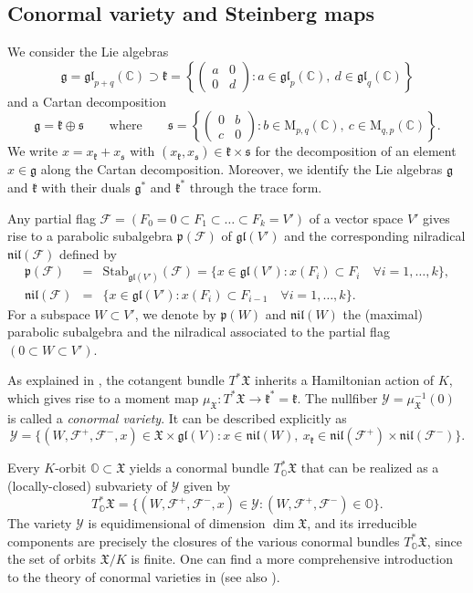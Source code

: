 \documentclass[ALCO,Unicode]{cedram}
\newcommand{\fk}{\mathfrak{k}}
\newcommand{\fs}{\mathfrak{s}}
\newcommand{\fg}{\mathfrak{g}}
\newcommand{\fp}{\mathfrak{p}}
\newcommand{\gl}{\mathfrak{gl}}
\newcommand{\nil}{\mathfrak{nil}}
\newcommand{\Mat}{\mathrm{M}}
\newcommand{\flag}{\mathcal{F}}
\newcommand{\conormal}{\mathcal{Y}}
\newcommand{\Xorbit}{\mathbb{O}}
\newcommand{\Xfv}{\mathfrak{X}}
\newcommand{\mC}{\mathbb{C}}
\begin{document}
\subsection{Conormal variety and Steinberg maps}
\label{section-1.2}
We consider the Lie algebras
\[
\fg=\gl_{p+q}(\mC)\supset\fk=\left\{\begin{pmatrix} a & 0\\ 0 & d \end{pmatrix}:a\in\gl_p(\mC),\ d\in\gl_q(\mC)\right\}
\]
and a Cartan decomposition
\[
\fg=\fk\oplus\fs\qquad\mbox{where}\qquad\fs=\left\{\begin{pmatrix} 0 & b\\ c & 0 \end{pmatrix}:b\in\Mat_{p,q}(\mC),\ c\in\Mat_{q,p}(\mC)\right\}.
\]
We write $x=x_\fk+x_\fs$ with $(x_\fk,x_\fs)\in\fk\times\fs$ for the decomposition of an element $x\in\fg$ along the Cartan decomposition.
Moreover, we identify the Lie algebras $\fg$ and $\fk$ with their duals $\fg^*$ and $\fk^*$ through the trace form.

Any partial flag $\flag=(F_0=0\subset F_1\subset\ldots\subset F_k=V')$ of a vector space $V'$ gives rise to a parabolic subalgebra $\fp(\flag)$ of $\gl(V')$ and the corresponding nilradical $\nil(\flag)$ defined by
\begin{eqnarray*}
\fp(\flag) & = & \mathrm{Stab}_{\gl(V')}(\flag)=\{x\in\gl(V'):x(F_i)\subset F_i\quad \forall i=1,\ldots,k\},\\
\nil(\flag) & = & \{x\in\gl(V'):x(F_i)\subset F_{i-1}\quad\forall i=1,\ldots,k\}.
\end{eqnarray*}
For a subspace $W\subset V'$, we denote by $\fp(W)$ and $\nil(W)$ the (maximal) parabolic subalgebra and the nilradical associated to the partial flag $(0\subset W\subset V')$.

As explained in \cite[\S3]{FN2}, the cotangent bundle $T^*\Xfv$ inherits a Hamiltonian action of $K$, which gives rise to a moment map $\mu_\Xfv:T^*\Xfv\to\fk^*=\fk$.
The nullfiber $\conormal=\mu_\Xfv^{-1}(0)$ is called a {\em conormal variety}. It can be described explicitly as
\[
\conormal=\{(W,\flag^+,\flag^-,x)\in \Xfv\times\gl(V):x\in\nil(W),\ x_\fk\in\nil(\flag^+)\times\nil(\flag^-)\}.
\]

Every $K$-orbit $\Xorbit\subset \Xfv$ yields a conormal bundle $T^*_\Xorbit\Xfv$ that can be realized as a (locally-closed) subvariety of $\conormal$ given by
\[
T^*_\Xorbit\Xfv=\{(W,\flag^+,\flag^-,x)\in\conormal:(W,\flag^+,\flag^-)\in\Xorbit\}.
\]
The variety $\conormal$ is equidimensional of dimension $\dim\Xfv$, and its irreducible components are precisely the closures of the various conormal bundles $T^*_\Xorbit\Xfv$, since the set of orbits $\Xfv/K$ is finite.
One can find a more comprehensive introduction to the theory of conormal varieties in \cite[\S 3]{FN2} (see also \cite{CG}).
\end{document}
